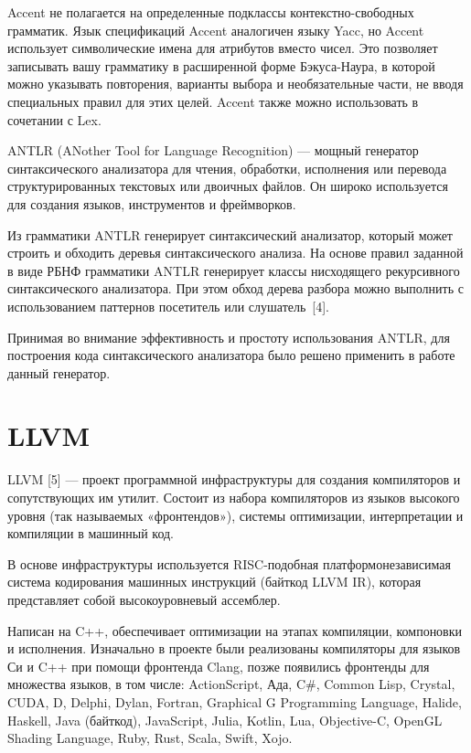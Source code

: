 Accent не полагается на определенные подклассы контекстно-свободных грамматик.
Язык спецификаций Accent аналогичен языку Yacc, но Accent использует символические имена для атрибутов вместо чисел.
Это позволяет записывать вашу грамматику в расширенной форме Бэкуса-Наура, в которой можно указывать повторения, варианты выбора и необязательные части, не вводя специальных правил для этих целей.
Accent также можно использовать в сочетании с Lex.

ANTLR (ANother Tool for Language Recognition) — мощный генератор синтаксического анализатора для чтения, обработки, исполнения или перевода структурированных текстовых или двоичных файлов.
Он широко используется для создания языков, инструментов и фреймворков.

Из грамматики ANTLR генерирует синтаксический анализатор, который может строить и обходить деревья синтаксического анализа.
На основе правил заданной в виде РБНФ грамматики ANTLR генерирует классы нисходящего рекурсивного синтаксического анализатора.
При этом обход дерева разбора можно выполнить с использованием паттернов посетитель или слушатель~[4].

Принимая во внимание эффективность и простоту использования ANTLR, для построения кода синтаксического анализатора было решено применить в работе данный генератор.

\section{LLVM}

LLVM [5] — проект программной инфраструктуры для создания компиляторов и сопутствующих им утилит.
Состоит из набора компиляторов из языков высокого уровня (так называемых «фронтендов»), системы оптимизации, интерпретации и компиляции в машинный код.

В основе инфраструктуры используется RISC-подобная платформонезависимая система кодирования машинных инструкций (байткод LLVM IR), которая представляет собой высокоуровневый ассемблер.

Написан на C++, обеспечивает оптимизации на этапах компиляции, компоновки и исполнения.
Изначально в проекте были реализованы компиляторы для языков Си и C++ при помощи фронтенда Clang, позже появились фронтенды для множества языков, в том числе: ActionScript, Ада, C\#, Common Lisp, Crystal, CUDA, D, Delphi, Dylan, Fortran, Graphical G Programming Language, Halide, Haskell, Java (байткод), JavaScript, Julia, Kotlin, Lua, Objective-C, OpenGL Shading Language, Ruby, Rust, Scala, Swift, Xojo.

